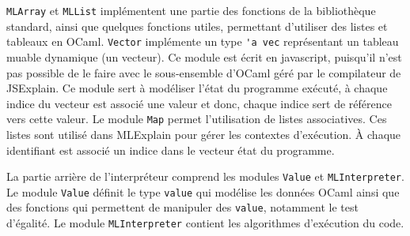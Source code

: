\documentclass{easychair}
\begin{document}
\verb|MLArray| et \verb|MLList| implémentent une partie des fonctions de la 
bibliothèque standard, ainsi que quelques fonctions utiles, permettant 
d'utiliser des listes et tableaux en OCaml. \verb|Vector| implémente un type 
\verb|'a vec| représentant un tableau muable dynamique (un vecteur). Ce module 
est écrit en javascript, puisqu'il n'est pas possible de le faire avec le 
sous-ensemble d'OCaml géré par le compilateur de JSExplain. Ce module sert à 
modéliser l'état du programme exécuté, à chaque indice du vecteur est associé 
une valeur et donc, chaque indice sert de référence vers cette valeur. Le 
module \verb|Map| permet l'utilisation de listes associatives. Ces listes sont 
utilisé dans MLExplain pour gérer les contextes d'exécution. À chaque 
identifiant est associé un indice dans le vecteur état du programme.

La partie arrière de l'interpréteur comprend les modules \verb|Value| et 
\verb|MLInterpreter|. Le module \verb|Value| définit le type \verb|value| qui 
modélise les données OCaml ainsi que des fonctions qui permettent de manipuler 
des \verb|value|, notamment le test d'égalité. Le module \verb|MLInterpreter| 
contient les algorithmes d'exécution du code.


\end{document}
